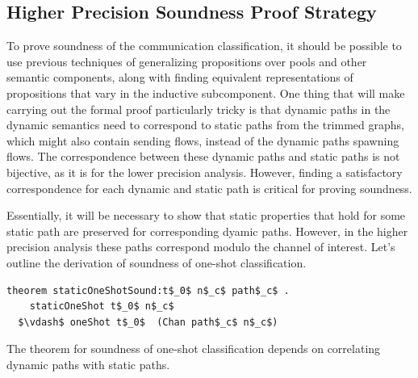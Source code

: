 \documentclass[letterpaper, 11pt]{extarticle}
\begin{document}
\subsection{Higher Precision Soundness Proof Strategy}
To prove soundness of the communication classification, it should be possible to use
previous techniques of generalizing propositions over pools and other semantic components,
along with finding equivalent representations of propositions that vary in the inductive
subcomponent. One thing that will make carrying out the formal proof particularly tricky is
that dynamic paths in the dynamic semantics need to correspond to static paths from
the trimmed graphs, which might also contain sending flows,
instead of the dynamic paths spawning flows.
The correspondence between these dynamic paths and static paths
is not bijective, as it is for the lower precision analysis. However, finding a satisfactory
correspondence for each dynamic and static path is critical for proving soundness.

Essentially, it will be necessary to show that static
properties that hold for some static path are preserved for corresponding dyamic paths. 
However, in the higher precision analysis these paths correspond modulo the channel of interest.
Let's outline the derivation of soundness of one-shot classification.

\begin{lstlisting}[language=logic, mathescape]
  theorem staticOneShotSound:t$_0$ n$_c$ path$_c$ . 
    staticOneShot t$_0$ n$_c$
  $\vdash$ oneShot t$_0$  (Chan path$_c$ n$_c$)
\end{lstlisting}

The theorem for soundness of one-shot classification depends on
correlating dynamic paths with static paths.
\end{document}
